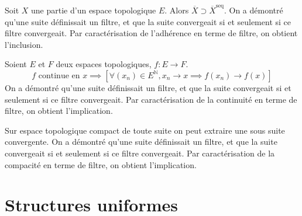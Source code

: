 \documentclass[a4paper, 11pt, french]{book}
\theoremstyle{plain} %
\theoremstyle{definition} %
\theoremstyle{remark} %
\newcommand{\1}{\mathds{1}}
\newcommand{\N}{\mathbb{N}}
\begin{document}
\proposition
Soit $X$ une partie d'un espace topologique $E$.
Alors $\overline{X}\supset\overline{X}^\text{seq}$.
\demonstration
On a démontré qu'une suite définissait un filtre, et que la suite convergeait si et seulement si ce filtre convergeait.
Par caractérisation de l'adhérence en terme de filtre, on obtient l'inclusion.

\proposition
Soient $E$ et $F$ deux espaces topologiques, $f:E\rightarrow F$.
$$
\text{$f$ continue en $x$}
\implies
\left[\forall(x_n)\in E^\N, x_n\rightarrow x\implies f(x_n)\rightarrow f(x)\right]
$$
\demonstration
On a démontré qu'une suite définissait un filtre, et que la suite convergeait si et seulement si ce filtre convergeait.
Par caractérisation de la continuité en terme de filtre, on obtient l'implication.

\proposition
Sur espace topologique compact de toute suite on peut extraire une sous suite convergente.
\demonstration
On a démontré qu'une suite définissait un filtre, et que la suite convergeait si et seulement si ce filtre convergeait.
Par caractérisation de la compacité en terme de filtre, on obtient l'implication.

\chapter{Structures uniformes}
\end{document}
